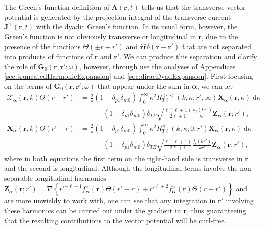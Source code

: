 The Green's function definition of $\mathbf{A}(\mathbf{r},t)$ tells us that the transverse vector potential is generated by the projection integral of the transverse current $\mathbf{J}^\perp(\mathbf{r},t)$ with the dyadic Green's function. In its usual form, however, the Green's function is not obviously transverse or longitudinal in $\mathbf{r}$, due to the presence of the functions $\Theta(\pm r \mp r')$ and $\hat{\mathbf{r}}\hat{\mathbf{r}}\delta(\mathbf{r} - \mathbf{r}')$ that are not separated into products of functions of $\mathbf{r}$ and $\mathbf{r}'$. We can produce this separation and clarify the role of $\mathbf{G}_0(\mathbf{r},\mathbf{r}';\omega)$, however, through use the analyses of Appendices \ref{sec:truncatedHarmonicExpansion} and \ref{sec:diracDyadExpansion}. First focusing on the terms of $\mathbf{G}_0(\mathbf{r},\mathbf{r}';\omega)$ that appear under the sum in $\bm{\alpha}$, we can let
\begin{equation}
\begin{split}
\bm{\mathcal{X}}_{\bm{\alpha}}(\mathbf{r},k)\Theta(r - r') &= \frac{2}{\pi}(1 - \delta_{p1}\delta_{m0})\int_0^\infty\kappa^2R_{T\ell}^{><}(k,\kappa;r',\infty)\mathbf{X}_{\bm{\alpha}}(\mathbf{r},\kappa)\;\mathrm{d}\kappa\\
&\qquad- (1 - \delta_{p1}\delta_{m0})\delta_{TE}\sqrt{\frac{\ell(\ell + 1)}{2\ell + 1}}\frac{h_\ell(kr')}{kr'}\mathbf{Z}_{\bm{\alpha}}(\mathbf{r};r'),\\[1.0em]
\mathbf{X}_{\bm{\alpha}}(\mathbf{r},k)\Theta(r' - r) &= \frac{2}{\pi}(1 - \delta_{p1}\delta_{m0})\int_0^\infty\kappa^2R_{T\ell}^\ll(k,\kappa;0,r')\mathbf{X}_{\bm{\alpha}}(\mathbf{r},\kappa)\;\mathrm{d}\kappa\\
&\qquad + (1 - \delta_{p1}\delta_{m0})\delta_{TE}\sqrt{\frac{\ell(\ell + 1)}{2\ell + 1}}\frac{j_\ell(kr')}{kr'}\mathbf{Z}_{\bm{\alpha}}(\mathbf{r};r'),
\end{split}
\end{equation}
where in both equations the first term on the right-hand side is transverse in $\mathbf{r}$ and the second is longitudinal. Although the longitudinal terms involve the non-separable longitudinal harmonics $\mathbf{Z}_{\bm{\alpha}}(\mathbf{r};r') = \nabla\left\{r'^{-\ell + 1} f_{\bm{\alpha}}^<(\mathbf{r})\Theta(r' - r) + r'^{\ell + 2} f_{\bm{\alpha}}^>(\mathbf{r})\Theta(r - r')\right\}$ and are more unwieldy to work with, one can see that any integration in $\mathbf{r}'$ involving these harmonics can be carried out under the gradient in $\mathbf{r}$, thus guaranteeing that the resulting contributions to the vector potential will be curl-free.


